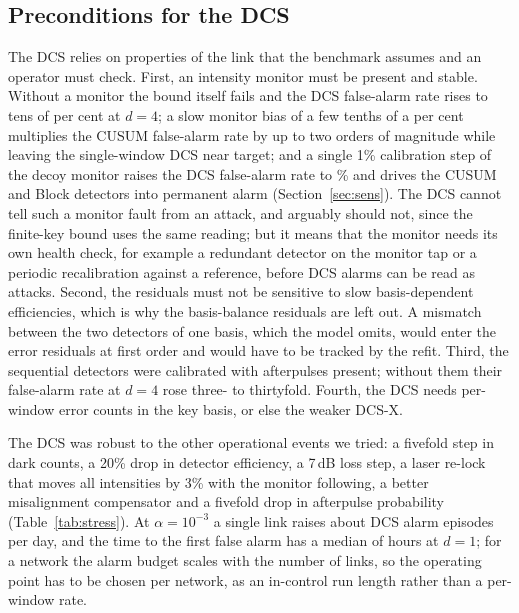 \subsection{Preconditions for the DCS}
The DCS relies on properties of the link that the benchmark assumes and an operator must check. First, an intensity monitor must be present and stable. Without a monitor the bound itself fails and the DCS false-alarm rate rises to tens of per cent at $d=4$; a slow monitor bias of a few tenths of a per cent multiplies the CUSUM false-alarm rate by up to two orders of magnitude while leaving the single-window DCS near target; and a single 1\% calibration step of the decoy monitor raises the DCS false-alarm rate to \stressMonDCS\% and drives the CUSUM and Block detectors into permanent alarm (Section~\ref{sec:sens}). The DCS cannot tell such a monitor fault from an attack, and arguably should not, since the finite-key bound uses the same reading; but it means that the monitor needs its own health check, for example a redundant detector on the monitor tap or a periodic recalibration against a reference, before DCS alarms can be read as attacks. Second, the residuals must not be sensitive to slow basis-dependent efficiencies, which is why the basis-balance residuals are left out. A mismatch between the two detectors of one basis, which the model omits, would enter the error residuals at first order and would have to be tracked by the refit. Third, the sequential detectors were calibrated with afterpulses present; without them their false-alarm rate at $d=4$ rose three- to thirtyfold. Fourth, the DCS needs per-window error counts in the key basis, or else the weaker DCS-X.

The DCS was robust to the other operational events we tried: a fivefold step in dark counts, a 20\% drop in detector efficiency, a 7\,dB loss step, a laser re-lock that moves all intensities by 3\% with the monitor following, a better misalignment compensator and a fivefold drop in afterpulse probability (Table~\ref{tab:stress}). At $\alpha=10^{-3}$ a single link raises about \epiDCSDOne{} DCS alarm episodes per day, and the time to the first false alarm has a median of \firstfaDCSDOne{} hours at $d=1$; for a network the alarm budget scales with the number of links, so the operating point has to be chosen per network, as an in-control run length rather than a per-window rate.

